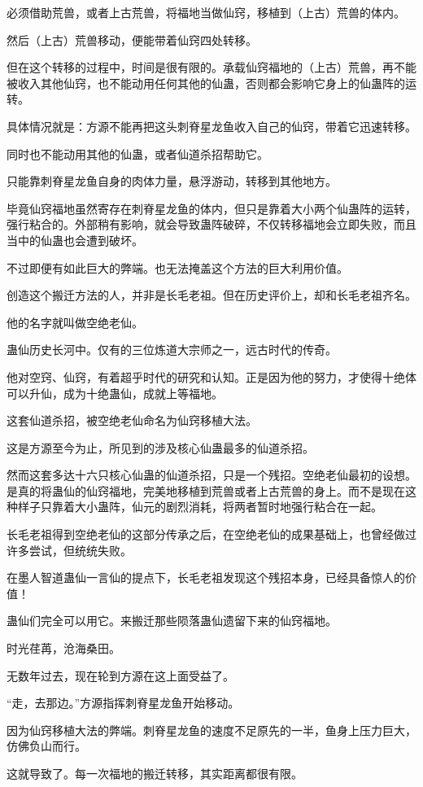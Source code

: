 \begin{this_body}
必须借助荒兽，或者上古荒兽，将福地当做仙窍，移植到（上古）荒兽的体内。

然后（上古）荒兽移动，便能带着仙窍四处转移。

但在这个转移的过程中，时间是很有限的。承载仙窍福地的（上古）荒兽，再不能被收入其他仙窍，也不能动用任何其他的仙蛊，否则都会影响它身上的仙蛊阵的运转。

具体情况就是：方源不能再把这头刺脊星龙鱼收入自己的仙窍，带着它迅速转移。

同时也不能动用其他的仙蛊，或者仙道杀招帮助它。

只能靠刺脊星龙鱼自身的肉体力量，悬浮游动，转移到其他地方。

毕竟仙窍福地虽然寄存在刺脊星龙鱼的体内，但只是靠着大小两个仙蛊阵的运转，强行粘合的。外部稍有影响，就会导致蛊阵破碎，不仅转移福地会立即失败，而且当中的仙蛊也会遭到破坏。

不过即便有如此巨大的弊端。也无法掩盖这个方法的巨大利用价值。

创造这个搬迁方法的人，并非是长毛老祖。但在历史评价上，却和长毛老祖齐名。

他的名字就叫做空绝老仙。

蛊仙历史长河中。仅有的三位炼道大宗师之一，远古时代的传奇。

他对空窍、仙窍，有着超乎时代的研究和认知。正是因为他的努力，才使得十绝体可以升仙，成为十绝蛊仙，成就上等福地。

这套仙道杀招，被空绝老仙命名为仙窍移植大法。

这是方源至今为止，所见到的涉及核心仙蛊最多的仙道杀招。

然而这套多达十六只核心仙蛊的仙道杀招，只是一个残招。空绝老仙最初的设想。是真的将蛊仙的仙窍福地，完美地移植到荒兽或者上古荒兽的身上。而不是现在这种样子只靠着大小蛊阵，仙元的剧烈消耗，将两者暂时地强行粘合在一起。

长毛老祖得到空绝老仙的这部分传承之后，在空绝老仙的成果基础上，也曾经做过许多尝试，但统统失败。

在墨人智道蛊仙一言仙的提点下，长毛老祖发现这个残招本身，已经具备惊人的价值！

蛊仙们完全可以用它。来搬迁那些陨落蛊仙遗留下来的仙窍福地。

时光荏苒，沧海桑田。

无数年过去，现在轮到方源在这上面受益了。

“走，去那边。”方源指挥刺脊星龙鱼开始移动。

因为仙窍移植大法的弊端。刺脊星龙鱼的速度不足原先的一半，鱼身上压力巨大，仿佛负山而行。

这就导致了。每一次福地的搬迁转移，其实距离都很有限。


\end{this_body}
